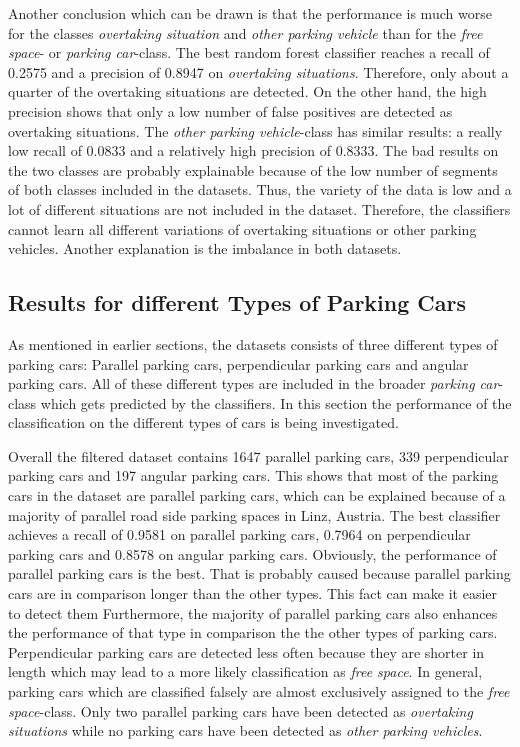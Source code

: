 Another conclusion which can be drawn is that the performance is much worse for the classes \emph{overtaking situation} and \emph{other parking vehicle} than for the \emph{free space}- or \emph{parking car}-class. The best random forest classifier reaches a recall of 0.2575 and a precision of 0.8947 on \emph{overtaking situations}. Therefore, only about a quarter of the overtaking situations are detected. 
On the other hand, the high precision shows that only a low number of false positives are detected as overtaking situations. 
The \emph{other parking vehicle}-class has similar results: a really low recall of 0.0833 and a relatively high precision of 0.8333.
The bad results on the two classes are probably explainable because of the low number of segments of both classes included in the datasets. Thus, the variety of the data is low and a lot of different situations are not included in the dataset. Therefore, the classifiers cannot learn all different variations of overtaking situations or other parking vehicles. Another explanation is the imbalance in both datasets.






\subsection{Results for different Types of Parking Cars}

As mentioned in earlier sections, the datasets consists of three different types of parking cars: Parallel parking cars, perpendicular parking cars and angular parking cars. All of these different types are included in the broader \emph{parking car}-class which gets predicted by the classifiers. In this section the performance of the classification on the different types of cars is being investigated.

Overall the filtered dataset contains 1647 parallel parking cars, 339 perpendicular parking cars and 197 angular parking cars. This shows that most of the parking cars in the dataset are parallel parking cars, which can be explained because of a majority of parallel road side parking spaces in Linz, Austria. The best classifier achieves a recall of 0.9581 on parallel parking cars, 0.7964 on perpendicular parking cars and 0.8578 on angular parking cars. 
Obviously, the performance of parallel parking cars is the best. That is probably caused because parallel parking cars are in comparison longer than the other types. This fact can make it easier to detect them Furthermore, the majority of parallel parking cars also enhances the performance of that type in comparison the the other types of parking cars. Perpendicular parking cars are detected less often because they are shorter in length which may lead to a more likely classification as \emph{free space}. In general, parking cars which are classified falsely are almost exclusively assigned to the \emph{free space}-class. Only two parallel parking cars have been detected as \emph{overtaking situations} while no parking cars have been detected as \emph{other parking vehicles}.






